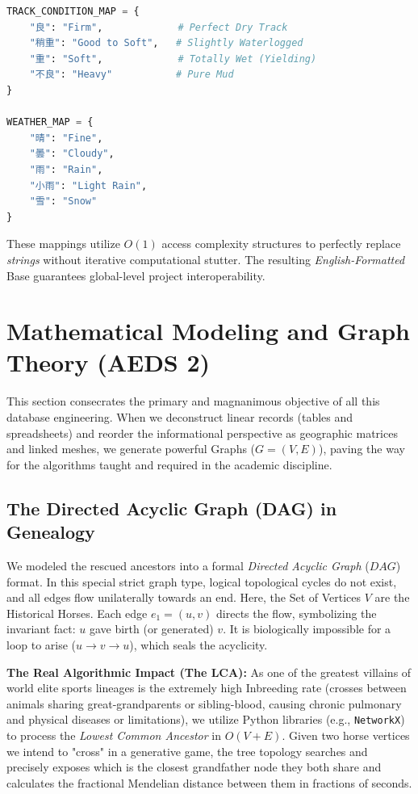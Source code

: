 \documentclass[12pt,a4paper]{article}
\begin{document}
\begin{lstlisting}[language=Python, caption=Static Dictionary of Translation and Conversion O(1) Matrices]
TRACK_CONDITION_MAP = {
    "良": "Firm",             # Perfect Dry Track
    "稍重": "Good to Soft",   # Slightly Waterlogged
    "重": "Soft",             # Totally Wet (Yielding)
    "不良": "Heavy"           # Pure Mud
}

WEATHER_MAP = {
    "晴": "Fine", 
    "曇": "Cloudy", 
    "雨": "Rain", 
    "小雨": "Light Rain", 
    "雪": "Snow"
}
\end{lstlisting}

These mappings utilize $O(1)$ access complexity structures to perfectly replace \textit{strings} without iterative computational stutter. The resulting \textit{English-Formatted} Base guarantees global-level project interoperability.

\section{Mathematical Modeling and Graph Theory (AEDS 2)}
This section consecrates the primary and magnanimous objective of all this database engineering. When we deconstruct linear records (tables and spreadsheets) and reorder the informational perspective as geographic matrices and linked meshes, we generate powerful Graphs ($G=(V, E)$), paving the way for the algorithms taught and required in the academic discipline.

\subsection{The Directed Acyclic Graph (DAG) in Genealogy}
We modeled the rescued ancestors into a formal \textit{Directed Acyclic Graph} ($DAG$) format. In this special strict graph type, logical topological cycles do not exist, and all edges flow unilaterally towards an end.
Here, the Set of Vertices $V$ are the Historical Horses. Each edge $e_{1}=(u, v)$ directs the flow, symbolizing the invariant fact: $u$ gave birth (or generated) $v$. It is biologically impossible for a loop to arise ($u \to v \to u$), which seals the acyclicity.

\textbf{The Real Algorithmic Impact (The LCA):} As one of the greatest villains of world elite sports lineages is the extremely high Inbreeding rate (crosses between animals sharing great-grandparents or sibling-blood, causing chronic pulmonary and physical diseases or limitations), we utilize Python libraries (e.g., \texttt{NetworkX}) to process the \textit{Lowest Common Ancestor} in $O(V+E)$.
Given two horse vertices we intend to "cross" in a generative game, the tree topology searches and precisely exposes which is the closest grandfather node they both share and calculates the fractional Mendelian distance between them in fractions of seconds.
\end{document}

